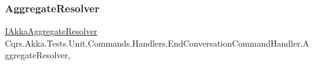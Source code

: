 \subsubsection{\texorpdfstring{Aggregate\+Resolver}{AggregateResolver}}
{\footnotesize\ttfamily \hyperlink{interfaceCqrs_1_1Akka_1_1Domain_1_1IAkkaAggregateResolver}{I\+Akka\+Aggregate\+Resolver} Cqrs.\+Akka.\+Tests.\+Unit.\+Commands.\+Handlers.\+End\+Conversation\+Command\+Handler.\+Aggregate\+Resolver\hspace{0.3cm}{\ttfamily [get]}, {\ttfamily [protected]}}

